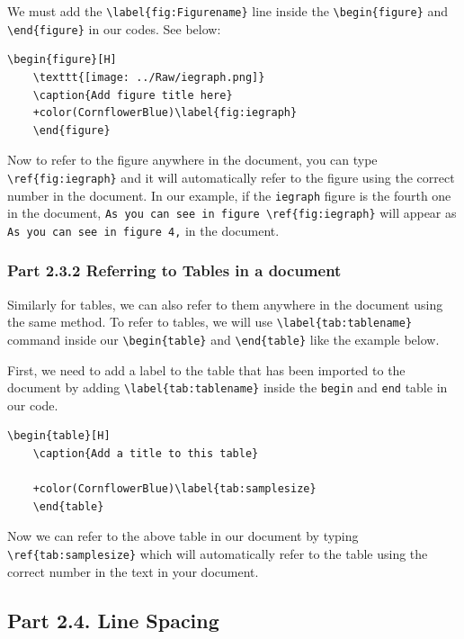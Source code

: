 \documentclass[12pts]{report}
\begin{document}
We must add the \verb|\label{fig:Figurename}| line inside the \verb|\begin{figure}| and \verb|\end{figure}| in our codes. See below:

\begin{Verbatim}[commandchars=+\(\)]
	\begin{figure}[H]
	\texttt{[image: ../Raw/iegraph.png]}
	\caption{Add figure title here}
	+color(CornflowerBlue)\label{fig:iegraph}
	\end{figure}
\end{Verbatim}

Now to refer to the figure anywhere in the document, you can type \verb|\ref{fig:iegraph}| and it will automatically refer to the figure using the correct number in the document. In our example, if the \texttt{iegraph}	figure is the fourth one in the document, \verb|As you can see in figure \ref{fig:iegraph}| will appear as \texttt{As you can see in figure 4,} in the document. 

\subsubsection*{Part 2.3.2 Referring to Tables in a document}

Similarly for tables, we can also refer to them anywhere in the document using the same method. To refer to tables, we will use \verb|\label{tab:tablename}| command inside our \verb|\begin{table}| and \verb|\end{table}| like the example below. 

First, we need to add a label to the table that has been imported to the document by adding \verb|\label{tab:tablename}| inside the \texttt{begin} and \texttt{end} table in our code. 

\begin{Verbatim}[commandchars=+\(\)]
	\begin{table}[H]
	\caption{Add a title to this table}
	
	+color(CornflowerBlue)\label{tab:samplesize}
	\end{table}
\end{Verbatim}

Now we can refer to the above table in our document by typing \verb|\ref{tab:samplesize}| which will automatically refer to the table using the correct number in the text in your document. 

\subsection*{Part 2.4. Line Spacing}
\end{document}
